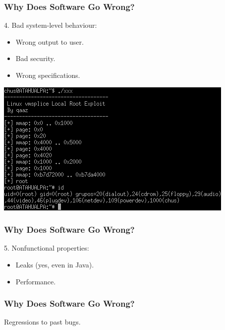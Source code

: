 \documentclass{beamer}
\newenvironment{changemargin}[1]{%
  \begin{list}{}{%
    \setlength{\topsep}{0pt}%
    \setlength{\leftmargin}{#1}%
    \setlength{\rightmargin}{1em}
    \setlength{\listparindent}{\parindent}%
    \setlength{\itemindent}{\parindent}%
    \setlength{\parsep}{\parskip}%
  }%
  \item[]}{\end{list}}
\begin{document}
\begin{frame}

  \frametitle{Why Does Software Go Wrong?}

  \begin{changemargin}{2em}
  4. Bad system-level behaviour:
\begin{itemize}
  \item Wrong output to user.
  \item Bad security.
  \item Wrong specifications.
\end{itemize}
  \end{changemargin}
\begin{center}
\includegraphics[height=.4\textheight]{L01/fot3.png}
\end{center}

\end{frame}

\begin{frame}
  \frametitle{Why Does Software Go Wrong?}

  \Large
  \begin{changemargin}{2em}
  5. Nonfunctional properties:
\begin{itemize}
  \item Leaks (yes, even in Java).
  \item Performance.
\end{itemize}
  \end{changemargin}

\end{frame}

\begin{frame}

  \frametitle{Why Does Software Go Wrong?}
  \begin{changemargin}{2em}

\Large
 Regressions to past bugs.
  \end{changemargin}
\end{frame}
\end{document}
